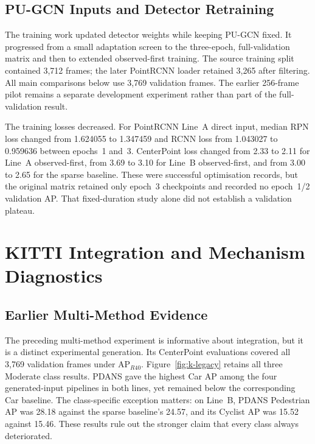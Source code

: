 \FloatBarrier


\subsection{PU-GCN Inputs and Detector Retraining}
\label{sec:adaptation-evidence}

The training work updated detector weights while keeping PU-GCN fixed.
It progressed from a small adaptation screen to the three-epoch,
full-validation matrix and then to extended observed-first training.
The source training split contained 3,712 frames; the later PointRCNN
loader retained 3,265 after filtering. All main comparisons below use
3,769 validation frames. The earlier 256-frame pilot remains a separate
development experiment rather than part of the full-validation result.



The training losses decreased. For PointRCNN Line~A direct input, median
RPN loss changed from 1.624055 to 1.347459 and RCNN loss from 1.043027
to 0.959636 between epochs~1 and~3. CenterPoint loss changed from
2.33 to 2.11 for Line~A observed-first, from 3.69 to 3.10 for Line~B
observed-first, and from 3.00 to 2.65 for the sparse baseline.
These were successful optimisation records, but the original matrix retained
only epoch~3 checkpoints and recorded no epoch~1/2 validation AP. That
fixed-duration study alone did not establish a validation plateau.



\FloatBarrier
\section{KITTI Integration and Mechanism Diagnostics}
\label{sec:kitti-diagnostics}

\subsection{Earlier Multi-Method Evidence}

The preceding multi-method experiment is informative about integration,
but it is a distinct experimental generation. Its CenterPoint evaluations
covered all 3,769 validation frames under AP$_{R40}$.
Figure~\ref{fig:k-legacy} retains all three Moderate class results.
PDANS gave the highest Car AP among the four generated-input pipelines
in both lines, yet remained below the corresponding Car baseline.
The class-specific exception matters: on Line~B, PDANS Pedestrian AP
was 28.18 against the sparse baseline's 24.57, and its Cyclist AP
was 15.52 against 15.46. These results rule out the stronger claim
that every class always deteriorated.

